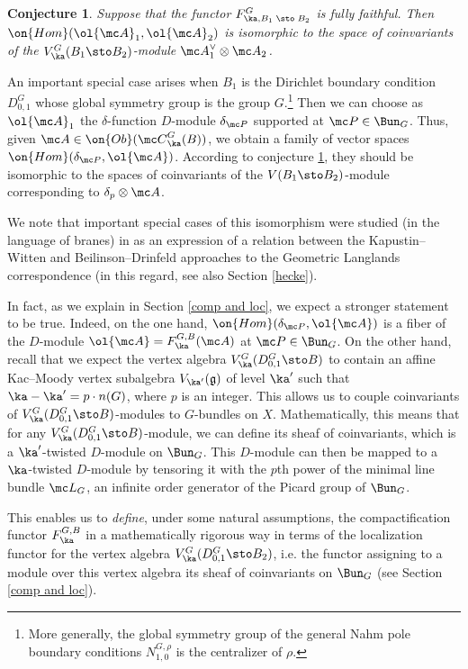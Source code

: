 \documentclass[11pt,reqno]{amsart}
\theoremstyle{plain}
\newtheorem{conj}[theorem]{Conjecture}
\numberwithin{equation}{section}
\newcommand{\g}{\mathfrak{g}}
\theoremstyle{definition}
\begin{document}
\begin{conj}    \label{Hom and conf1}
Suppose that the functor $F^G_{\ka,B_1\; \sto \; B_2}$ is fully
faithful. Then $\on{Hom}(\ol{\mc A}_1,\ol{\mc A}_2)$ is
isomorphic to the space of coinvariants of the $V^G_\ka(B_1\sto
B_2)$-module ${\mc A}_1^\vee \otimes {\mc A}_2$.
\end{conj}

An important special case arises when $B_1$ is the Dirichlet boundary
condition $D^G_{0,1}$ whose global symmetry group is the group
$G$.\footnote{More generally, the global symmetry group of the general
  Nahm pole boundary conditions $N^{G,\rho}_{1,0}$ is the centralizer
  of $\rho$.} Then we can choose as $\ol{\mc A}_1$ the
$\delta$-function $D$-module $\delta_{\mc P}$ supported at ${\mc P}
\in \Bun_G$. Thus, given ${\mc A} \in \on{Ob}({\mc C}^G_\ka(B))$, we
obtain a family of vector spaces $\on{Hom}(\delta_{\mc P},\ol{\mc
  A})$. According to conjecture \ref{Hom and conf1}, they should be
isomorphic to the spaces of coinvariants of the $V(B_1\sto
B_2)$-module corresponding to $\delta_p \otimes {\mc A}$.

We note that important special cases of this isomorphism were studied
(in the language of branes) in \cite{BT} as an expression of a
relation between the Kapustin--Witten and Beilinson--Drinfeld
approaches to the Geometric Langlands correspondence (in this regard,
see also Section \ref{hecke}).

In fact, as we explain in Section \ref{comp and loc}, we expect a
stronger statement to be true. Indeed, on the one hand,
$\on{Hom}(\delta_{\mc P},\ol{\mc A})$ is a fiber of the $D$-module
$\ol{\mc A} = F^{G,B}_\ka({\mc A})$ at ${\mc P} \in \Bun_G$. On the
other hand, recall that we expect the vertex algebra
$V^G_\ka(D^G_{0,1} \sto B)$ to contain an affine Kac--Moody vertex
subalgebra $V_{\ka'}(\g)$ of level $\ka'$ such that $\ka-\ka' = p
\cdot n(G)$, where $p$ is an integer. This allows us to couple
coinvariants of $V^G_\ka(D^G_{0,1} \sto B)$-modules to $G$-bundles on
$X$. Mathematically, this means that for any $V^G_\ka(D^G_{0,1} \sto
B)$-module, we can define its sheaf of coinvariants, which is a
$\ka'$-twisted $D$-module on $\Bun_G$. This $D$-module can then be
mapped to a $\ka$-twisted $D$-module by tensoring it with the $p$th
power of the minimal line bundle ${\mc L}_G$, an infinite order
generator of the Picard group of $\Bun_G$.

This enables us to {\em define}, under some natural assumptions, the
compactification functor $F^{G,B}_\ka$ in a mathematically rigorous
way in terms of the localization functor for the vertex algebra
$V^G_\ka(D^G_{0,1} \sto B_2)$, i.e. the functor assigning to a module
over this vertex algebra its sheaf of coinvariants on $\Bun_G$ (see
Section \ref{comp and loc}).
\end{document}

